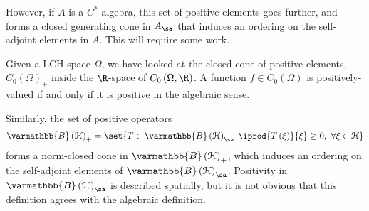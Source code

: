 \documentclass[10pt]{mypackage}
\renewcommand*{\mathbb}[1]{\varmathbb{#1}}
\newcommand{\B}{\mathbb{B}}
\begin{document}
However, if $A$ is a $C^{\ast}$-algebra, this set of positive elements goes further, and forms a closed generating cone in $A_{\sa}$ that induces an ordering on the self-adjoint elements in $A$. This will require some work.\newline

Given a LCH space $\Omega$, we have looked at the closed cone of positive elements, $C_0\left(\Omega\right)_{+}$ inside the $\R$-space of $C_0\left(\Omega,\R\right)$. A function $f\in C_0\left(\Omega\right)$ is positively-valued if and only if it is positive in the algebraic sense.\newline

Similarly, the set of positive operators
\begin{align*}
  \B\left(\mathcal{H}\right)_{+} = \set{T\in \B\left(\mathcal{H}\right)_{\sa} | \iprod{T\left(\xi\right)}{\xi} \geq 0,~\forall \xi\in \mathcal{H}}
\end{align*}
forms a norm-closed cone in $\B\left(\mathcal{H}\right)_{+}$, which induces an ordering on the self-adjoint elements of $\B\left(\mathcal{H}\right)_{\sa}$. Positivity in $\B\left(\mathcal{H}\right)_{\sa}$ is described spatially, but it is not obvious that this definition agrees with the algebraic definition.\newline
\end{document}
